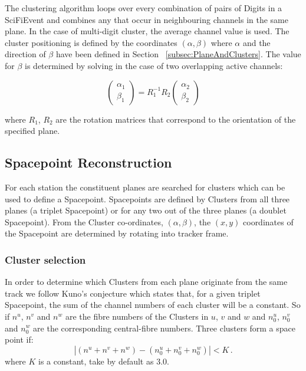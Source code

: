   The clustering algorithm loops over every combination of pairs of Digits in a SciFiEvent and combines any that occur in neighbouring channels in the same plane. In the case of multi-digit cluster, the average channel value is used. The cluster positioning is defined by the coordinates $(\alpha, \beta)$ where $\alpha$ and the direction of $\beta$ have been defined in Section ~\ref{subsec:PlaneAndClusters}. The value for $\beta$ is determined by solving in the case of two overlapping active channels:
  
  \begin{equation}
    \begin{pmatrix}
     \alpha_1 \\ \beta_1
    \end{pmatrix} = R_{1}^{-1} R_2
    \begin{pmatrix}
      \alpha_2 \\ \beta_2
    \end{pmatrix}
  \end{equation}
  
  \noindent
  where $R_1$, $R_2$ are the rotation matrices that correspond to the orientation of the specified plane. 

  \subsection{Spacepoint Reconstruction}
  \label{subsec:SpacepointReconstruction}
  For each station the constituent planes are searched for clusters which can be used to define a Spacepoint. Spacepoints are defined by Clusters from all three planes (a triplet Spacepoint) or for any two out of the three planes (a doublet Spacepoint). 
  From the Cluster co-ordinates, $(\alpha, \beta)$, the $(x, y)$ coordinates of the Spacepoint are determined by rotating into tracker frame.

  \subsubsection{Cluster selection}
  \label{subsubsec:ClusterSelection}
  In order to determine which Clusters from each plane originate from the same track we follow Kuno's conjecture\cite{MiceTrackers} which states that, for a given triplet Spacepoint, the sum of the channel numbers of each cluster will be a constant.  So if $n^u$, $n^v$ and $n^w$ are the fibre numbers of the Clusters in $u$, $v$ and $w$ and $n^u_0$, $n^v_0$ and $n^w_0$ are the corresponding central-fibre numbers. Three clusters form a space point  if:
  \begin{equation}
    | (n^u + n^v + n^w) - (n^u_0 + n^v_0 + n^w_0) | < K \, .
  \end{equation}
  where $K$ is a constant, take by default as 3.0.
  
